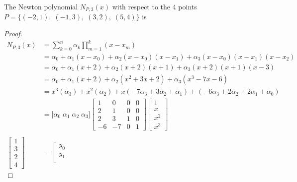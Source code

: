 \begin{example}
The {Newton polynomial} $N_{P,3}(x)$ with respect to the $4$ points\\
$P=\{(-2,1),\; (-1,3),\; (3,2),\; (5,4)\}$ is
\end{example}
\begin{proof}
\begin{align*}
  N_{P,3}(x)
    &= \sum_{k=0}^n \alpha_k \prod_{m=1}^k (x-x_m)
  \\&= \alpha_0 + \alpha_1(x-x_0) + \alpha_2(x-x_0)(x-x_1) + \alpha_3(x-x_0)(x-x_1)(x-x_2) 
  \\&= \alpha_0 + \alpha_1(x+2) + \alpha_2(x+2)(x+1) + \alpha_3(x+2)(x+1)(x-3) 
  \\&= \alpha_0 + \alpha_1(x+2) + \alpha_2(x^2+3x+2) + \alpha_3(x^3-7x-6)
  \\&= x^3(\alpha_3) + x^2(\alpha_2) + x(-7\alpha_3+3\alpha_2+\alpha_1)
      +(-6\alpha_3 + 2\alpha_2 + 2\alpha_1 + \alpha_0)
  \\&= \Big[ \alpha_0 \; \alpha_1 \; \alpha_2 \; \alpha_3 \Big] 
       \left[\begin{array}{rrrr}
          1  &   0  & 0  & 0  \\
          2  &   1  & 0  & 0  \\
          2  &   3  & 1  & 0  \\
         -6  &  -7  & 0  & 1
       \end{array}\right]
       \left[\begin{array}{l}
         1   \\
         x   \\
         x^2 \\
         x^3
       \end{array}\right]
  \\
  \\
  \left[\begin{array}{l}
     1  \\
     3  \\
     2  \\
     4  
  \end{array}\right]
    &= \left[\begin{array}{l}
         y_0 \\
         y_1 \\

\end{array}
\end{align*}
\end{proof}
